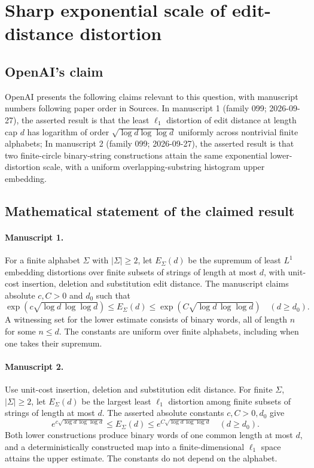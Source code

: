 \documentclass[11pt]{article}
\begin{document}
\section*{Sharp exponential scale of edit-distance distortion}

\subsection{OpenAI's claim}
OpenAI presents the following claims relevant to this question, with manuscript numbers following paper order in Sources. In manuscript 1 (family 099; 2026-09-27), the asserted result is that the least $\ell_1$ distortion of edit distance at length cap $d$ has logarithm of order $\sqrt{\log d\log\log d}$ uniformly across nontrivial finite alphabets; In manuscript 2 (family 099; 2026-09-27), the asserted result is that two finite-circle binary-string constructions attain the same exponential lower-distortion scale, with a uniform overlapping-substring histogram upper embedding.

\subsection{Mathematical statement of the claimed result}
\paragraph{Manuscript 1.}
For a finite alphabet $\Sigma$ with $|\Sigma|\ge2$, let $E_{\Sigma}(d)$ be the supremum of least $L^1$ embedding distortions over finite subsets of strings of length at most $d$, with unit-cost insertion, deletion and substitution edit distance. The manuscript claims absolute $c,C>0$ and $d_0$ such that
\[
 \exp(c\sqrt{\log d\,\log\log d})\le E_{\Sigma}(d)
 \le\exp(C\sqrt{\log d\,\log\log d})\quad(d\ge d_0).
\]
A witnessing set for the lower estimate consists of binary words, all of length $n$ for some $n\le d$. The constants are uniform over finite alphabets, including when one takes their supremum.

\paragraph{Manuscript 2.}
Use unit-cost insertion, deletion and substitution edit distance. For finite $\Sigma$, $|\Sigma|\ge2$, let $E_{\Sigma}(d)$ be the largest least $\ell_1$ distortion among finite subsets of strings of length at most $d$. The asserted absolute constants $c,C>0,d_0$ give
\[
 e^{c\sqrt{\log d\,\log\log d}}\le E_{\Sigma}(d)
 \le e^{C\sqrt{\log d\,\log\log d}}\quad(d\ge d_0).
\]
Both lower constructions produce binary words of one common length at most $d$, and a deterministically constructed map into a finite-dimensional $\ell_1$ space attains the upper estimate. The constants do not depend on the alphabet.
\end{document}
